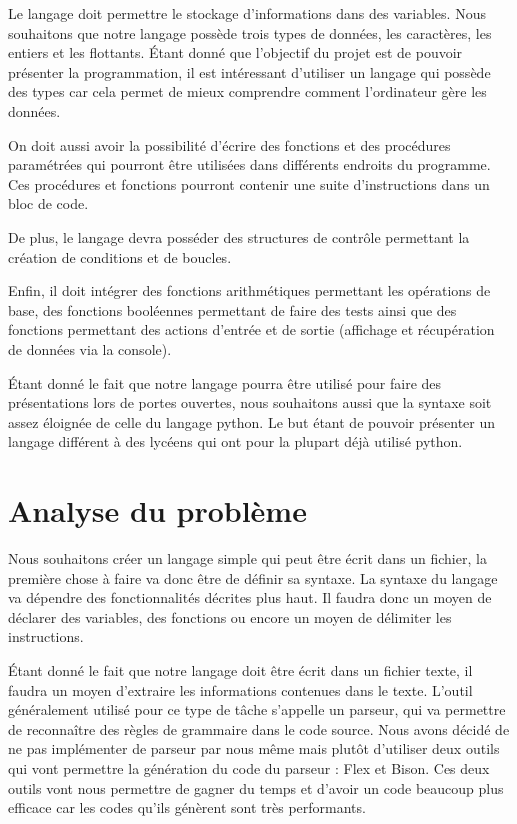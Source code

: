 \documentclass[a4paper]{article}%
\begin{document}
Le langage doit permettre le stockage d'informations dans des variables. Nous
souhaitons que notre langage possède trois types de données, les caractères, les
entiers et les flottants. Étant donné que l'objectif du projet est de pouvoir
présenter la programmation, il est intéressant d'utiliser un langage qui possède
des types car cela permet de mieux comprendre comment l'ordinateur gère les
données.

On doit aussi avoir la possibilité d'écrire des fonctions et des procédures
paramétrées qui pourront être utilisées dans différents endroits du programme.
Ces procédures et fonctions pourront contenir une suite d'instructions dans un
bloc de code.

De plus, le langage devra posséder des structures de contrôle permettant la
création de conditions et de boucles.

Enfin, il doit intégrer des fonctions arithmétiques permettant les
opérations de base, des fonctions booléennes permettant de faire des
tests ainsi que des fonctions permettant des actions d'entrée et de sortie
(affichage et récupération de données via la console).

Étant donné le fait que notre langage pourra être utilisé pour faire des
présentations lors de portes ouvertes, nous souhaitons aussi que la syntaxe soit
assez éloignée de celle du langage python. Le but étant de pouvoir présenter
un langage différent à des lycéens qui ont pour la plupart déjà utilisé python.

\section{Analyse du problème}

Nous souhaitons créer un langage simple qui peut être écrit dans un fichier, la
première chose à faire va donc être de définir sa syntaxe. La syntaxe du langage
va dépendre des fonctionnalités décrites plus haut. Il faudra donc un moyen de
déclarer des variables, des fonctions ou encore un moyen de délimiter les
instructions.

Étant donné le fait que notre langage doit être écrit dans un fichier texte, il
faudra un moyen d'extraire les informations contenues dans le texte. L'outil
généralement utilisé pour ce type de tâche s'appelle un parseur, qui va
permettre de reconnaître des règles de grammaire dans le code source. Nous avons
décidé de ne pas implémenter de parseur par nous même mais plutôt d'utiliser
deux outils qui vont permettre la génération du code du parseur : Flex et Bison.
Ces deux outils vont nous permettre de gagner du temps et d'avoir un code
beaucoup plus efficace car les codes qu'ils génèrent sont très performants.
\end{document}
